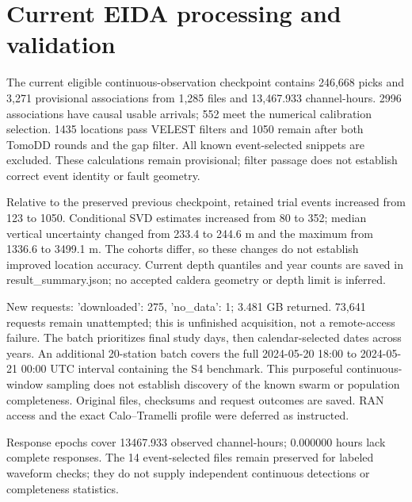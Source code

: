 \section{Current EIDA processing and validation}

The current eligible continuous-observation checkpoint contains 246,668 picks and 3,271 provisional associations from 1,285 files and 13,467.933 channel-hours. 2996 associations have causal usable arrivals; 552 meet the numerical calibration selection. 1435 locations pass VELEST filters and 1050 remain after both TomoDD rounds and the gap filter. All known event-selected snippets are excluded. These calculations remain provisional; filter passage does not establish correct event identity or fault geometry.

Relative to the preserved previous checkpoint, retained trial events increased from 123 to 1050. Conditional SVD estimates increased from 80 to 352; median vertical uncertainty changed from 233.4 to 244.6 m and the maximum from 1336.6 to 3499.1 m. The cohorts differ, so these changes do not establish improved location accuracy. Current depth quantiles and year counts are saved in result\_summary.json; no accepted caldera geometry or depth limit is inferred.

New requests: {'downloaded': 275, 'no\_data': 1}; 3.481 GB returned. 73,641 requests remain unattempted; this is unfinished acquisition, not a remote-access failure. The batch prioritizes final study days, then calendar-selected dates across years. An additional 20-station batch covers the full 2024-05-20 18:00 to 2024-05-21 00:00 UTC interval containing the S4 benchmark. This purposeful continuous-window sampling does not establish discovery of the known swarm or population completeness. Original files, checksums and request outcomes are saved. RAN access and the exact Calo--Tramelli profile were deferred as instructed.

\par{}\par{}\par{}

Response epochs cover 13467.933 observed channel-hours; 0.000000 hours lack complete responses. The 14 event-selected files remain preserved for labeled waveform checks; they do not supply independent continuous detections or completeness statistics.

